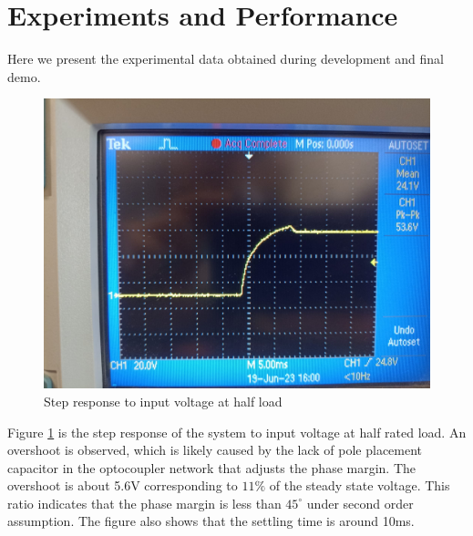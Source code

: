 \documentclass[12pt]{article}
\begin{document}
 \section{Experiments and Performance}
    Here we present the experimental data obtained during development and final demo.

    \begin{figure}[H]
        \centering
        \includegraphics[width = \textwidth]{img/step_resp.jpeg}
        \caption{Step response to input voltage at half load}
        \label{fig:step-respo}
    \end{figure}

    Figure \ref{fig:step-respo} is the step response of the system to input voltage at half rated load. An overshoot is observed, which is likely caused by the lack of pole placement capacitor in the optocoupler network that adjusts the phase margin. The overshoot is about 5.6V corresponding to $11\%$ of the steady state voltage. This ratio indicates that the phase margin is less than $45^\circ$ under second order assumption. The figure also shows that the settling time is around 10ms.
\end{document}

